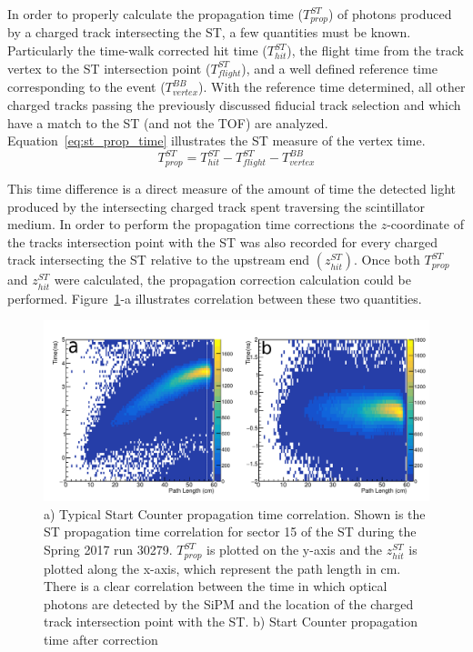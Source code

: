 
In order to properly calculate the propagation time ($T^{ST}_{prop}$) of photons produced by a charged track intersecting the ST, a few quantities must be known.  Particularly the time-walk corrected hit time ($T^{ST}_{hit}$), the flight time from the track vertex to the ST intersection point ($T^{ST}_{flight}$), and a well defined reference time corresponding to the event ($T^{BB}_{vertex}$).  With the reference time determined, all other charged tracks passing the previously discussed fiducial track selection and which have a match to the ST (and not the TOF) are analyzed.  Equation~\ref{eq:st_prop_time} illustrates the ST measure of the vertex time.
	\begin{equation} \label{eq:st_prop_time}
		T^{ST}_{prop} = T^{ST}_{hit} - T^{ST}_{flight} - T^{BB}_{vertex}
	\end{equation} 

This time difference is a direct measure of the amount of time the detected light produced by the intersecting charged track spent traversing the scintillator medium.  In order to perform the propagation time corrections the $z$-coordinate of the tracks intersection point with the ST was also recorded for every charged track intersecting the ST relative to the upstream end $(z^{ST}_{hit})$.  Once both $T^{ST}_{prop}$ and $z^{ST}_{hit}$ were calculated, the propagation correction calculation could be performed.  Figure~\ref{fig:proptimeuncorr}-a illustrates correlation between these two quantities.
	\begin{figure}[!htb]
		\centering
		\includegraphics[width=1.0\columnwidth]{calibration/figs/drawing}
		\caption{a) Typical Start Counter propagation time correlation.  Shown is the ST propagation time correlation for sector 15 of the ST during the Spring 2017 run 30279. $T^{ST}_{prop}$ is plotted on the y-axis and the $z^{ST}_{hit}$ is plotted along the x-axis, which represent the path length in cm. There is a clear correlation between the time in which optical photons are detected by the SiPM and the location of the charged track intersection point with the ST. b) Start Counter propagation time after correction}
		\label{fig:proptimeuncorr}
	\end{figure}

